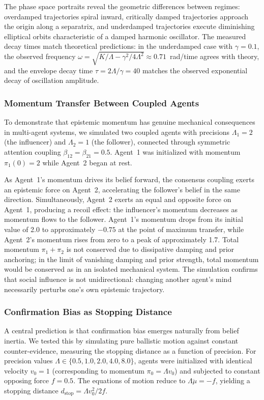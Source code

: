 \documentclass[12pt]{article}
\begin{document}
The phase space portraits reveal the geometric differences between regimes: overdamped trajectories spiral inward, critically damped trajectories approach the origin along a separatrix, and underdamped trajectories execute diminishing elliptical orbits characteristic of a damped harmonic oscillator. The measured decay times match theoretical predictions: in the underdamped case with $\gamma = 0.1$, the observed frequency $\omega = \sqrt{K/\Lambda - \gamma^2/4\Lambda^2} \approx 0.71$~rad/time agrees with theory, and the envelope decay time $\tau = 2\Lambda/\gamma = 40$ matches the observed exponential decay of oscillation amplitude.

\subsubsection{Momentum Transfer Between Coupled Agents}

To demonstrate that epistemic momentum has genuine mechanical consequences in multi-agent systems, we simulated two coupled agents with precisions $\Lambda_1 = 2$ (the influencer) and $\Lambda_2 = 1$ (the follower), connected through symmetric attention coupling $\beta_{12} = \beta_{21} = 0.5$. Agent~1 was initialized with momentum $\pi_1(0) = 2$ while Agent~2 began at rest.

As Agent~1's momentum drives its belief forward, the consensus coupling exerts an epistemic force on Agent~2, accelerating the follower's belief in the same direction. Simultaneously, Agent~2 exerts an equal and opposite force on Agent~1, producing a recoil effect: the influencer's momentum decreases as momentum flows to the follower. Agent~1's momentum drops from its initial value of 2.0 to approximately $-0.75$ at the point of maximum transfer, while Agent~2's momentum rises from zero to a peak of approximately 1.7. Total momentum $\pi_1 + \pi_2$ is not conserved due to dissipative damping and prior anchoring; in the limit of vanishing damping and prior strength, total momentum would be conserved as in an isolated mechanical system. The simulation confirms that social influence is not unidirectional: changing another agent's mind necessarily perturbs one's own epistemic trajectory.

\subsubsection{Confirmation Bias as Stopping Distance}

A central prediction is that confirmation bias emerges naturally from belief inertia. We tested this by simulating pure ballistic motion against constant counter-evidence, measuring the stopping distance as a function of precision. For precision values $\Lambda \in \{0.5, 1.0, 2.0, 4.0, 8.0\}$, agents were initialized with identical velocity $v_0 = 1$ (corresponding to momentum $\pi_0 = \Lambda v_0$) and subjected to constant opposing force $f = 0.5$. The equations of motion reduce to $\Lambda \ddot{\mu} = -f$, yielding a stopping distance $d_{\text{stop}} = \Lambda v_0^2 / 2f$.
\end{document}
